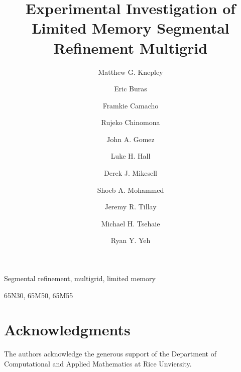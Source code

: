 \documentclass[final]{siamltex}
\title{Experimental Investigation of Limited Memory Segmental Refinement Multigrid}
\author{Matthew G. Knepley \footnotemark[2]
  \and Eric Buras \footnotemark[2]
  \and Framkie Camacho \footnotemark[2]
  \and Rujeko Chinomona \footnotemark[2]
  \and John A. Gomez \footnotemark[2]
  \and Luke H. Hall \footnotemark[2]
  \and Derek J. Mikesell \footnotemark[2]
  \and Shoeb A. Mohammed \footnotemark[2]
  \and Jeremy R. Tillay \footnotemark[2]
  \and Michael H. Tsehaie \footnotemark[2]
  \and Ryan Y. Yeh \footnotemark[2]
}
\begin{document}
\maketitle

\pagestyle{myheadings}
\thispagestyle{plain}

\renewcommand{\thefootnote}{\fnsymbol{footnote}}


\renewcommand{\thefootnote}{\arabic{footnote}}

\begin{abstract}
\end{abstract}

\begin{keywords}
Segmental refinement, multigrid, limited memory
\end{keywords}

\begin{AMS}
65N30, 65M50, 65M55
\end{AMS}



\section*{Acknowledgments}
The authors acknowledge the generous support of the Department of Computational and Applied Mathematics at Rice Unviersity.

 

\end{document}
